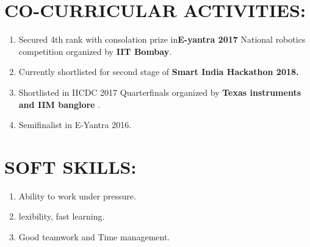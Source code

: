 \documentclass[16pt,a4paper]{article}
\begin{document}
\section{CO-CURRICULAR ACTIVITIES:}
\begin{enumerate}
	\item 	Secured 4th rank with consolation prize in\textbf{E-yantra 2017 }National robotics competition organized by\textbf{ IIT Bombay}.
	\item	Currently shortlisted for second stage of \textbf {Smart India Hackathon 2018.}
	\item	Shortlisted in IICDC 2017 Quarterfinals organized by\textbf{ Texas instruments and IIM banglore} .
	\item	Semifinalist in E-Yantra 2016.	
\end{enumerate}
\section{ SOFT SKILLS:}
\begin{enumerate}
	\item 	Ability to work under pressure.
	\item lexibility, fast learning.
	\item	Good teamwork and Time management.	
\end{enumerate}

   
\end{document}
